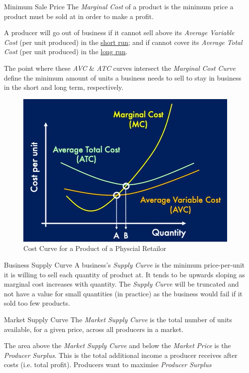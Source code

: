 \documentclass[11pt,a4paper]{article}
\begin{document}
  \begin{remark}{Minimum Sale Price}
    The \textit{Marginal Cost} of a product is the minimum price a product must be sold at in order to make a profit.

    \par A producer will go out of business if it cannot sell above its \textit{Average Variable Cost} (per unit produced) in the \underline{short run}; and if cannot cover its \textit{Average Total Cost} (per unit produced) in the \underline{long run}.

    \par The point where these \textit{AVC} \& \textit{ATC} curves intersect the \textit{Marginal Cost Curve} define the minimum amount of units a business needs to sell to stay in business in the short and long term, respectively.
  \end{remark}

  \begin{figure}[ht!]
    \centering
    \includegraphics[width=.5\textwidth]{physicalCostCurve.PNG}
    \caption{Cost Curve for a Product of a Physcial Retailor}
  \end{figure}

  \begin{definition}{Business Supply Curve}
    A business's \textit{Supply Curve} is the minimum price-per-unit it is willing to sell each quantity of product at. It tends to be upwards sloping as marginal cost increases with quantity. The \textit{Supply Curve} will be truncated and not have a value for small quantities (in practice) as the business would fail if it sold too few products.
  \end{definition}

  \begin{definition}{Market Supply Curve}
    The \textit{Market Supply Curve} is the total number of units available, for a given price, across all producers in a market.

    \par The area above the \textit{Market Supply Curve} and below the \textit{Market Price} is the \textit{Producer Surplus}. This is the total additional income a producer receives after costs (i.e. total profit). Producers want to maximise \textit{Producer Surplus}
  \end{definition}
\end{document}

